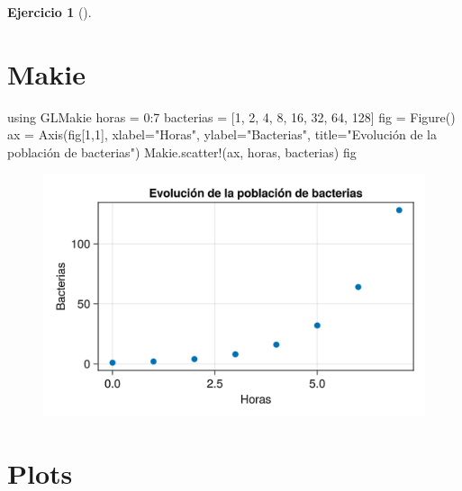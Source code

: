 \documentclass[
  a4paper,
]{scrreport}
\newenvironment{Shaded}{\begin{snugshade}}{\end{snugshade}}
\newcommand{\BuiltInTok}[1]{\textcolor[rgb]{0.00,0.23,0.31}{#1}}
\newcommand{\FloatTok}[1]{\textcolor[rgb]{0.68,0.00,0.00}{#1}}
\newcommand{\FunctionTok}[1]{\textcolor[rgb]{0.28,0.35,0.67}{#1}}
\newcommand{\ImportTok}[1]{\textcolor[rgb]{0.00,0.46,0.62}{#1}}
\newcommand{\NormalTok}[1]{\textcolor[rgb]{0.00,0.23,0.31}{#1}}
\newcommand{\OperatorTok}[1]{\textcolor[rgb]{0.37,0.37,0.37}{#1}}
\newcommand{\StringTok}[1]{\textcolor[rgb]{0.13,0.47,0.30}{#1}}
\theoremstyle{definition}
\newtheorem{exercise}{Ejercicio}[chapter]
\theoremstyle{remark}
\begin{document}
\begin{exercise}[]
\begin{tcolorbox}
\section{Makie}

\begin{Shaded}
\begin{Highlighting}[]
\ImportTok{using} \BuiltInTok{GLMakie}
\NormalTok{horas }\OperatorTok{=} \FloatTok{0}\OperatorTok{:}\FloatTok{7}
\NormalTok{bacterias }\OperatorTok{=}\NormalTok{ [}\FloatTok{1}\NormalTok{, }\FloatTok{2}\NormalTok{, }\FloatTok{4}\NormalTok{, }\FloatTok{8}\NormalTok{, }\FloatTok{16}\NormalTok{, }\FloatTok{32}\NormalTok{, }\FloatTok{64}\NormalTok{, }\FloatTok{128}\NormalTok{]}
\NormalTok{fig }\OperatorTok{=} \FunctionTok{Figure}\NormalTok{()}
\NormalTok{ax }\OperatorTok{=} \FunctionTok{Axis}\NormalTok{(fig[}\FloatTok{1}\NormalTok{,}\FloatTok{1}\NormalTok{], xlabel}\OperatorTok{=}\StringTok{"Horas"}\NormalTok{, ylabel}\OperatorTok{=}\StringTok{"Bacterias"}\NormalTok{, title}\OperatorTok{=}\StringTok{"Evolución de la población de bacterias"}\NormalTok{)}
\NormalTok{Makie.}\FunctionTok{scatter!}\NormalTok{(ax, horas, bacterias)}
\NormalTok{fig}
\end{Highlighting}
\end{Shaded}

\begin{figure}[H]

{\centering \includegraphics{03-funciones-elementales_files/figure-pdf/cell-3-output-1.png}

}

\end{figure}

\section{Plots}


\end{tcolorbox}
\end{exercise}
\end{document}
